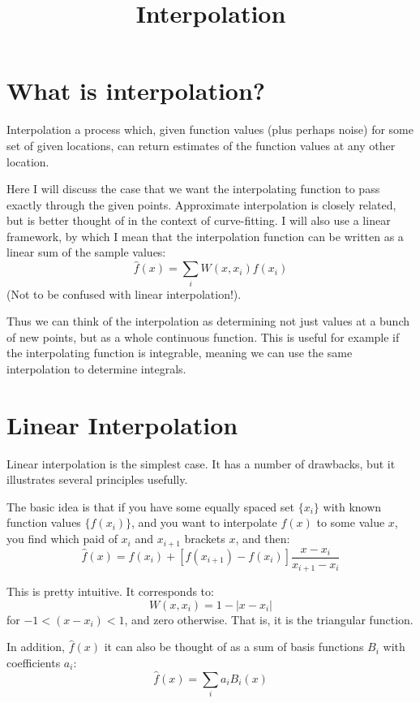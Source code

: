 \title{Interpolation}

\section{What is interpolation?}

Interpolation a process which, given function values (plus perhaps
noise) for some set of given locations, can return estimates of the
function values at any other location.

Here I will discuss the case that we want the interpolating function
to pass exactly through the given points. Approximate interpolation is
closely related, but is better thought of in the context of
curve-fitting. I will also use a linear framework, by which I mean
that the interpolation function can be written as a linear sum of the
sample values:
\begin{equation}
\hat f(x) = \sum_i W(x, x_i) f(x_i)
\end{equation}
(Not to be confused with linear interpolation!).

Thus we can think of the interpolation as determining not just values
at a bunch of new points, but as a whole continuous function.  This is
useful for example if the interpolating function is integrable,
meaning we can use the same interpolation to determine integrals.

\section{Linear Interpolation}

Linear interpolation is the simplest case. It has a number of
drawbacks, but it illustrates several principles usefully. 

The basic idea is that if you have some equally spaced set $\{x_i\}$
with known function values $\{f(x_i)\}$, and you want to interpolate
$f(x)$ to some value $x$, you find which paid of $x_i$ and $x_{i+1}$
brackets $x$, and then:
\begin{equation}
\hat f(x) = f(x_i) + \left[f(x_{i+1}) - f(x_i)\right] \frac{x -
x_i}{x_{i+1} - x_i}
\end{equation}

This is pretty intuitive. It corresponds to:
\begin{equation}
W(x, x_i) = 1 - |x - x_i|
\end{equation}
for $-1< (x-x_i) < 1$, and zero otherwise. That is, it is the
triangular function.

In addition, $\hat f(x)$ it can also be thought of as a sum of basis
functions $B_i$ with coefficients $a_i$:
\begin{equation}
\hat f(x) = \sum_i a_i B_i(x)
\end{equation}

